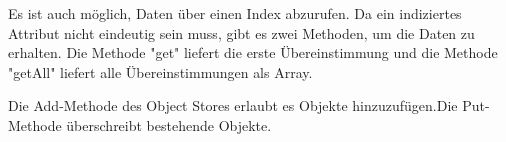 
Es ist auch möglich, Daten über einen Index abzurufen. Da ein indiziertes 
Attribut nicht eindeutig sein muss, gibt es zwei Methoden, um die Daten zu erhalten. Die Methode "get" liefert die erste Übereinstimmung und die Methode "getAll" liefert alle Übereinstimmungen als Array.


Die Add-Methode des Object Stores erlaubt es Objekte hinzuzufügen.Die Put-Methode überschreibt bestehende Objekte.
\cite{MDNIndexedDB}
\cite{MDNUsingIndexedDB}